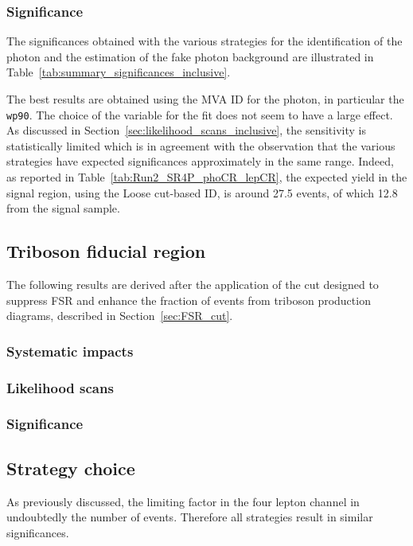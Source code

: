 \subsubsection{Significance}
The significances obtained with the various strategies for the identification of the photon and the estimation of the fake photon background are illustrated in Table~\ref{tab:summary_significances_inclusive}.


The best results are obtained using the MVA ID for the photon, in particular the \texttt{wp90}.
The choice of the variable for the fit does not seem to have a large effect.
As discussed in Section~\ref{sec:likelihood_scans_inclusive}, the sensitivity is statistically limited
which is in agreement with the observation that the various strategies have expected significances approximately in the same range.
Indeed, as reported in Table~\ref{tab:Run2_SR4P_phoCR_lepCR}, the expected yield in the signal region, using the Loose cut-based ID,
is around 27.5 events, of which 12.8 from the signal sample.

\subsection{Triboson fiducial region}
\label{sec:results_4L_FSRcut}
The following results are derived after the application of the cut
designed to suppress FSR and enhance the fraction of events from triboson production diagrams,
described in Section~\ref{sec:FSR_cut}.

\subsubsection{Systematic impacts}


\subsubsection{Likelihood scans}


\subsubsection{Significance}


\subsection{Strategy choice}
As previously discussed, the limiting factor in the four lepton channel in undoubtedly the number of events.
Therefore all strategies result in similar significances.


